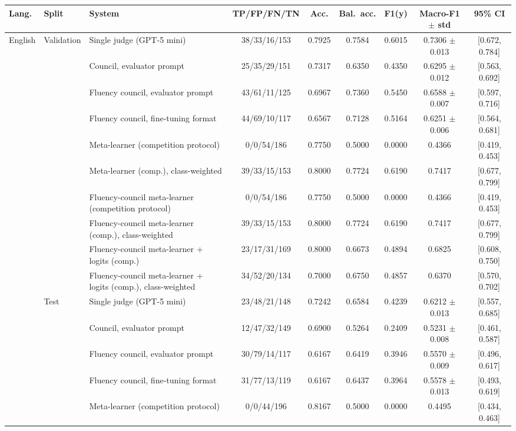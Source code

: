 \begin{tabular}{lllcccccc}
\hline
\textbf{Lang.} & \textbf{Split} & \textbf{System} & \textbf{TP/FP/FN/TN} & \textbf{Acc.} & \textbf{Bal.~acc.} & \textbf{F1(y)} & \textbf{Macro-F1 $\pm$ std} & \textbf{95\% CI} \\
\hline
English & Validation & Single judge (GPT-5 mini) & 38/33/16/153 & 0.7925 & 0.7584 & 0.6015 & 0.7306 $\pm$ 0.013 & [0.672, 0.784] \\
 &  & Council, evaluator prompt & 25/35/29/151 & 0.7317 & 0.6350 & 0.4350 & 0.6295 $\pm$ 0.012 & [0.563, 0.692] \\
 &  & Fluency council, evaluator prompt & 43/61/11/125 & 0.6967 & 0.7360 & 0.5450 & 0.6588 $\pm$ 0.007 & [0.597, 0.716] \\
 &  & Fluency council, fine-tuning format & 44/69/10/117 & 0.6567 & 0.7128 & 0.5164 & 0.6251 $\pm$ 0.006 & [0.564, 0.681] \\
 &  & Meta-learner (competition protocol) & 0/0/54/186 & 0.7750 & 0.5000 & 0.0000 & 0.4366 & [0.419, 0.453] \\
 &  & Meta-learner (comp.), class-weighted & 39/33/15/153 & 0.8000 & 0.7724 & 0.6190 & 0.7417 & [0.677, 0.799] \\
 &  & Fluency-council meta-learner (competition protocol) & 0/0/54/186 & 0.7750 & 0.5000 & 0.0000 & 0.4366 & [0.419, 0.453] \\
 &  & Fluency-council meta-learner (comp.), class-weighted & 39/33/15/153 & 0.8000 & 0.7724 & 0.6190 & 0.7417 & [0.677, 0.799] \\
 &  & Fluency-council meta-learner + logits (comp.) & 23/17/31/169 & 0.8000 & 0.6673 & 0.4894 & 0.6825 & [0.608, 0.750] \\
 &  & Fluency-council meta-learner + logits (comp.), class-weighted & 34/52/20/134 & 0.7000 & 0.6750 & 0.4857 & 0.6370 & [0.570, 0.702] \\
 & Test & Single judge (GPT-5 mini) & 23/48/21/148 & 0.7242 & 0.6584 & 0.4239 & 0.6212 $\pm$ 0.013 & [0.557, 0.685] \\
 &  & Council, evaluator prompt & 12/47/32/149 & 0.6900 & 0.5264 & 0.2409 & 0.5231 $\pm$ 0.008 & [0.461, 0.587] \\
 &  & Fluency council, evaluator prompt & 30/79/14/117 & 0.6167 & 0.6419 & 0.3946 & 0.5570 $\pm$ 0.009 & [0.496, 0.617] \\
 &  & Fluency council, fine-tuning format & 31/77/13/119 & 0.6167 & 0.6437 & 0.3964 & 0.5578 $\pm$ 0.013 & [0.493, 0.619] \\
 &  & Meta-learner (competition protocol) & 0/0/44/196 & 0.8167 & 0.5000 & 0.0000 & 0.4495 & [0.434, 0.463] \\

\end{tabular}
